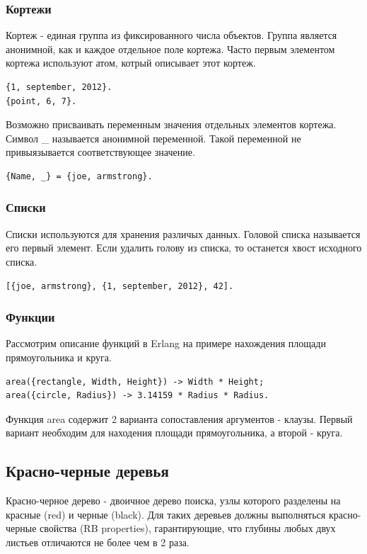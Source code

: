 		\subsubsection{Кортежи}
			Кортеж - единая группа из фиксированного числа объектов. Группа является анонимной, как и каждое отдельное 
			поле кортежа. Часто первым элементом кортежа используют атом, котрый описывает этот кортеж.
			\begin{lstlisting}
{1, september, 2012}.
{point, 6, 7}.
			\end{lstlisting}
			
			Возможно присваивать переменным значения отдельных элементов кортежа. Символ \_ называется анонимной переменной. 
			Такой переменной не привыязывается соответствующее значение.
			\begin{lstlisting}
{Name, _} = {joe, armstrong}.
			\end{lstlisting} 

		\subsubsection{Списки} 
			Списки используются для хранения различых данных. Головой списка называется его первый элемент. Если удалить 
			голову из списка, то останется хвост исходного списка.
			\begin{lstlisting}
[{joe, armstrong}, {1, september, 2012}, 42].
			\end{lstlisting}

		\subsubsection{Функции}
			Рассмотрим описание функций в Erlang на примере нахождения площади прямоугольника и круга.
			\begin{lstlisting}
area({rectangle, Width, Height}) -> Width * Height;
area({circle, Radius}) -> 3.14159 * Radius * Radius.
			\end{lstlisting}
			Функция area содержит 2 варианта сопоставления аргументов - клаузы. Первый вариант необходим для находения 
			площади прямоугольника, а второй - круга. 			
	

	\subsection{Красно-черные деревья}
		Красно-черное дерево - двоичное дерево поиска, узлы которого 
		разделены на красные (red) и черные (black). Для таких деревьев
		должны выполняться красно-черные свойства (RB properties), 
		гарантирующие, что глубины любых двух листьев отличаются не более
		чем в 2 раза.~\cite{kormen}

